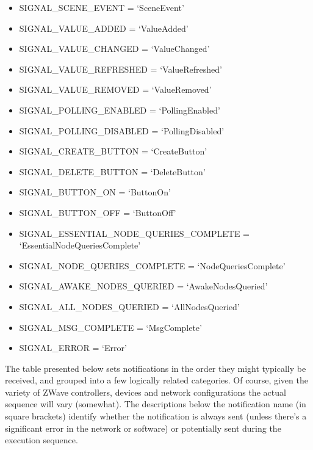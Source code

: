 \documentclass[letterpaper,10pt,english]{sphinxmanual}
\begin{document}
\begin{fulllineitems}
\begin{itemize}
\item {} 
SIGNAL\_SCENE\_EVENT = `SceneEvent'

\item {} 
SIGNAL\_VALUE\_ADDED = `ValueAdded'

\item {} 
SIGNAL\_VALUE\_CHANGED = `ValueChanged'

\item {} 
SIGNAL\_VALUE\_REFRESHED = `ValueRefreshed'

\item {} 
SIGNAL\_VALUE\_REMOVED = `ValueRemoved'

\item {} 
SIGNAL\_POLLING\_ENABLED = `PollingEnabled'

\item {} 
SIGNAL\_POLLING\_DISABLED = `PollingDisabled'

\item {} 
SIGNAL\_CREATE\_BUTTON = `CreateButton'

\item {} 
SIGNAL\_DELETE\_BUTTON = `DeleteButton'

\item {} 
SIGNAL\_BUTTON\_ON = `ButtonOn'

\item {} 
SIGNAL\_BUTTON\_OFF = `ButtonOff'

\item {} 
SIGNAL\_ESSENTIAL\_NODE\_QUERIES\_COMPLETE = `EssentialNodeQueriesComplete'

\item {} 
SIGNAL\_NODE\_QUERIES\_COMPLETE = `NodeQueriesComplete'

\item {} 
SIGNAL\_AWAKE\_NODES\_QUERIED = `AwakeNodesQueried'

\item {} 
SIGNAL\_ALL\_NODES\_QUERIED = `AllNodesQueried'

\item {} 
SIGNAL\_MSG\_COMPLETE = `MsgComplete'

\item {} 
SIGNAL\_ERROR = `Error'

\end{itemize}

The table presented below sets notifications in the order they might typically be received,
and grouped into a few logically related categories.  Of course, given the variety
of ZWave controllers, devices and network configurations the actual sequence will vary (somewhat).
The descriptions below the notification name (in square brackets) identify whether the
notification is always sent (unless there’s a significant error in the network or software)
or potentially sent during the execution sequence.


\end{fulllineitems}
\end{document}
